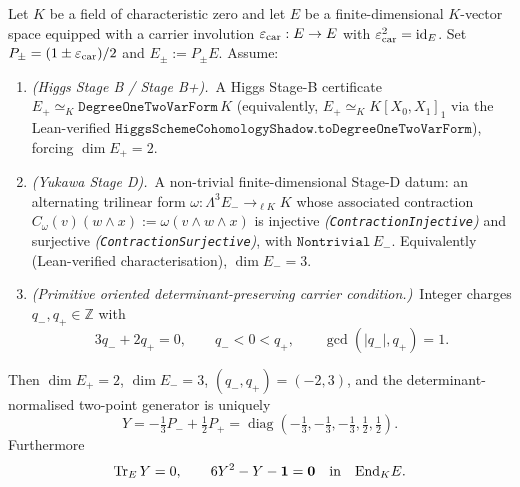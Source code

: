 \documentclass[11pt,a4paper]{article}
\begin{document}
\begin{theorem}
\label{thm:carrier-rigidity}
Let $K$ be a field of characteristic zero and let $E$ be a finite-dimensional $K$-vector space
equipped with a carrier involution $\varepsilon_{\mathrm{car}} : E \to E$ with $\varepsilon_{\mathrm{car}}^2 = \mathrm{id}_E$. Set
$P_\pm = (1 \pm \varepsilon_{\mathrm{car}})/2$ and $E_\pm := P_\pm E$. Assume:
\begin{enumerate}[label=(\roman*), leftmargin=1.7em]
    \item \emph{(Higgs Stage B / Stage B+).}\ A Higgs Stage-B
        certificate $E_+ \simeq_K \texttt{DegreeOneTwoVarForm}\,K$
        (equivalently, $E_+ \simeq_K K[X_0, X_1]_1$ via the
        Lean-verified
        $\texttt{HiggsSchemeCohomologyShadow.toDegreeOneTwoVarForm}$),
        forcing $\dim E_+ = 2$.
    \item \emph{(Yukawa Stage D).}\ A non-trivial finite-dimensional
        Stage-D datum: an alternating trilinear form
        $\omega : \Lambda^3 E_- \to_{\ell K} K$ whose associated
        contraction
        $C_\omega(v)(w \wedge x) := \omega(v \wedge w \wedge x)$ is
        injective \emph{(\texttt{ContractionInjective})} and
        surjective \emph{(\texttt{ContractionSurjective})}, with
        $\texttt{Nontrivial}\,E_-$.
        Equivalently (Lean-verified characterisation), $\dim E_- = 3$.
    \item \emph{(Primitive oriented determinant-preserving carrier
        condition.)}\ Integer charges $q_-, q_+ \in \mathbb Z$ with
        \[
        3 q_- + 2 q_+ = 0,
        \qquad
        q_- < 0 < q_+,
        \qquad
        \gcd(|q_-|, q_+) = 1.
        \]
\end{enumerate}
Then $\dim E_+ = 2$, $\dim E_- = 3$, $(q_-, q_+) = (-2, 3)$, and the
determinant-normalised two-point generator is uniquely
\[
Y = -\tfrac13 P_- + \tfrac12 P_+
  = \operatorname{diag}\!\left(-\tfrac13,-\tfrac13,-\tfrac13,\tfrac12,\tfrac12\right).
\]
Furthermore
\[
\operatorname{Tr}_E Y = 0,
\qquad
6 Y^2 - Y - \mathbf 1 = \mathbf 0
\quad\text{in}\quad
\mathrm{End}_K E.
\]
\end{theorem}
\end{document}
